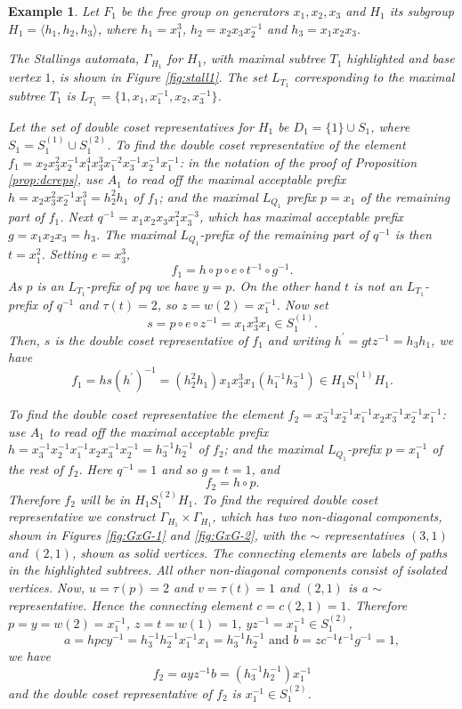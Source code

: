 \documentclass[a4paper,12pt]{article}
\newcommand{\G}{\Gamma }
\renewcommand{\t}{\tau }
\newtheorem{exam}[theorem]{Example}
\newenvironment{example}{\begin{exam} \rm}{\end{exam}}
\numberwithin{equation}{section}
\numberwithin{figure}{section}
\newcommand{\la}{\langle}
\newcommand{\ra}{\rangle}
\begin{document}
\begin{example}\label{ex:f_1}
Let $F_1$ be the free group on generators $x_1,x_2,x_3$ and $H_1$ its
subgroup $H_1=\la
h_1,h_2,h_3\ra$, where  $h_1= x_1^3$, $h_2=x_2x_3x_2^{-1}$ and
$h_3=x_1x_2x_3$.

The Stallings automata, $\G_{H_1}$ for $H_1$,
with maximal subtree $T_1$ highlighted and base vertex $1$, is shown
in Figure %
 \ref{fig:stall1}.
The set $L_{T_1}$ corresponding to the maximal subtree  $T_1$ is
 $L_{T_1}=\{1,x_1,x_1^{-1},x_2,x_3^{-1} \}$.

Let the set of double coset representatives for $H_1$ be $D_1=\{1\}\cup S_1$, 
where $S_1=  
S_1^{(1)}
\cup S_1^{(2)}$.
To find the double coset representative of the element $f_1 =
x_2x_3^2x_2^{-1} x_1^4x_3^3x_1^{-2}x_3^{-1}x_2^{-1}x_1^{-1}$: in
the notation of the proof of Proposition \ref{prop:dcreps}, use
${A_1}$ to read off the maximal acceptable prefix $h=x_2x_3^2x_2^{-1} x_1^3
=h_2^2h_1$
of $f_1$; and
the maximal $L_{Q_1}$ prefix $p=x_1$ of the remaining part of $f_1$. Next
$q^{-1}=x_1x_2x_3x_1^2x_3^{-3}$, which has maximal acceptable prefix
$g=x_1x_2x_3=h_3$. The maximal $L_{Q_1}$-prefix of the remaining part of $q^{-1}$
is then $t=x_1^2$. Setting $e=x_3^3$,
\[f_1=h\circ p\circ e\circ t^{-1}\circ g^{-1}.\]
As $p$ is an $L_{T_1}$-prefix of $pq$ we have $y=p$. On the other hand
$t$ is not an $L_{T_1}$-prefix of $q^{-1}$ and $\t(t)=2$, so $z=w(2)=x_1^{-1}$.
Now set
\[s=p\circ e\circ z^{-1}=x_1x_3^3x_1\in S_1^{(1)}.\]
Then,  $s$ is the  double coset representative of $f_1$ and writing $h^\prime=gtz^{-1}=h_3h_1$, we have 
\[f_1=hs(h^\prime)^{-1}=(h_2^{2}h_1) x_1x_3^3x_1(h_1^{-1}h_3^{-1})\in H_1S_1^{(1)}H_1.\]

To find the double coset representative  the element
$f_2=x_3^{-1}x_2^{-1}x_1^{-1}x_2x_3^{-1}x_2^{-1}x_1^{-1}$: use
${A_1}$ to read off the maximal acceptable prefix
$h=x_3^{-1}x_2^{-1}x_1^{-1}x_2x_3^{-1}x_2^{-1}=h_3^{-1}h_2^{-1}$
of $f_2$;
and  the
maximal $L_{Q_1}$-prefix $p=x_1^{-1}$ of the rest of $f_2$.  Here
$q^{-1}=1$ and so $g=t=1$, and
\[f_2=h\circ p.\]
Therefore $f_2$ will be in $H_1S_1^{(2)}H_1$. To find the required
double coset representative we construct $\G_{H_1}\times
\G_{H_1}$, which has two non-diagonal components, shown in Figures
\ref{fig:GxG-1} and \ref{fig:GxG-2},
with the $\sim$ representatives $(3,1)$ and $(2,1)$,  shown as
solid vertices. The connecting elements are labels of paths in the
highlighted subtrees.  All other non-diagonal components consist
of isolated vertices. Now, $u=\t(p)=2$ and $v=\t(t)=1$ and $(2,1)$
is a $\sim$ representative. Hence the  connecting element
$c=c(2,1)=1$. Therefore $p=y=w(2)=x_1^{-1}$, $z=t=w(1)=1$,
$yz^{-1}=x_1^{-1}\in S_1^{(2)}$,
\[a=hpcy^{-1}=h_3^{-1}h_2^{-1}x_1^{-1}x_1=h_3^{-1}h_2^{-1}
\textrm{ and }
b=zc^{-1}t^{-1}g^{-1}=1,\]
we have 
\[f_2=a yz^{-1} b=(h_3^{-1}h_2^{-1}) x_1^{-1}\]
and the double coset representative of $f_2$ is $x_1^{-1}\in S_1^{(2)}$.
\end{example}
\end{document}
